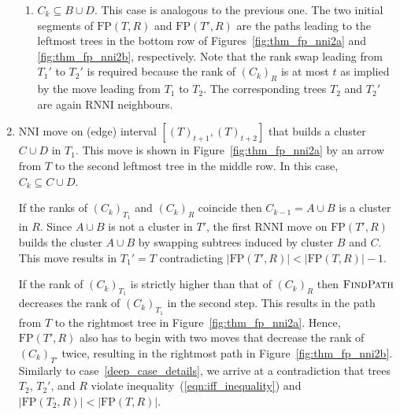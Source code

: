 \documentclass[11pt]{amsart}
\newcommand{\rnni}{\mathrm{RNNI}}
\newcommand{\findpath}{\textsc{FindPath}}
\newcommand{\nni}{\mathrm{NNI}}
\newcommand{\fp}{\mathrm{FP}}
\begin{document}
\begin{enumerate}[label = 1.{\arabic*}]
\begin{enumerate}[label = \theenumi.\arabic*]
\item $C_k \subseteq B \cup D$.
This case is analogous to the previous one.
The two initial segments of $\fp(T, R)$ and $\fp(T', R)$ are the paths leading to the leftmost trees in the bottom row of Figures~\ref{fig:thm_fp_nni2a} and \ref{fig:thm_fp_nni2b}, respectively.
Note that the rank swap leading from $T_1'$ to $T_2'$ is required because the rank of $(C_k)_R$ is at most $t$ as implied by the move leading from $T_1$ to $T_2$.
The corresponding trees $T_2$ and $T_2'$ are again $\rnni$ neighbours.
\end{enumerate}

\item $\nni$ move on (edge) interval $[(T)_{t+1}, (T)_{t+2}]$ that builds a cluster $C \cup D$ in $T_1$.
\label{case:one_or_two_moves_down}
This move is shown in Figure~\ref{fig:thm_fp_nni2a} by an arrow from $T$ to the second leftmost tree in the middle row.
In this case, $C_k \subseteq C \cup D$.

If the ranks of $(C_k)_{T_1}$ and $(C_k)_R$ coincide then $C_{k-1} = A \cup B$ is a cluster in $R$.
Since $A \cup B$ is not a cluster in $T'$, the first $\rnni$ move on $\fp(T', R)$ builds the cluster $A \cup B$ by swapping subtrees induced by cluster $B$ and $C$.
This move results in $T_1' = T$ contradicting $|\fp(T',R)| < |\fp(T,R)| - 1$.

If the rank of $(C_k)_{T_1}$ is strictly higher than that of $(C_k)_R$ then $\findpath$ decreases the rank of $(C_k)_{T_1}$ in the second step.
This results in the path from $T$ to the rightmost tree in Figure~\ref{fig:thm_fp_nni2a}.
Hence, $\fp(T', R)$ also has to begin with two moves that decrease the rank of $(C_k)_{T'}$ twice, resulting in the rightmost path in Figure~\ref{fig:thm_fp_nni2b}.
Similarly to case~\ref{deep_case_details}, we arrive at a contradiction that trees $T_2$, $T_2'$, and $R$ violate inequality~(\ref{eqn:iff_inequality}) and $|\fp(T_2,R)| < |\fp(T,R)|$.


\end{enumerate}
\end{document}
